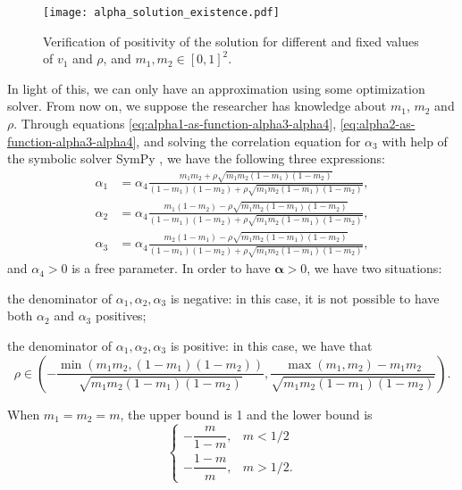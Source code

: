 \begin{figure}[!ht]
    \centering
    \caption{Verification of positivity of the solution for different and
    fixed values of $v_1$ and $\rho$, and $m_1, m_2 \in [0,1]^2$.} 
    \texttt{[image: alpha\_solution\_existence.pdf]}
    \label{fig:alpha-solutions}
\end{figure}

In light of this, we can only have an approximation using some
optimization solver. From now on, we suppose the researcher has knowledge about
$m_1$, $m_2$ and $\rho$. Through equations
\eqref{eq:alpha1-as-function-alpha3-alpha4}, 
\eqref{eq:alpha2-as-function-alpha3-alpha4}, and solving the correlation
equation for $\alpha_3$ with help of the symbolic solver SymPy \cite{sympy},
we have the following three expressions: 
\begin{equation*}
  \begin{aligned}
    \alpha_1 &= \alpha_4\frac{m_1m_2 + \rho\sqrt{m_1m_2(1-m_1)(1-m_2)}}{(1-m_1)(1-m_2) + \rho\sqrt{m_1m_2(1-m_1)(1-m_2)}}, \\
    \alpha_2 &= \alpha_4\frac{m_1(1-m_2) - \rho\sqrt{m_1m_2(1-m_1)(1-m_2)}}{(1-m_1)(1-m_2) + \rho\sqrt{m_1m_2(1-m_1)(1-m_2)}}, \\
    \alpha_3 &= \alpha_4\frac{m_2(1-m_1) - \rho\sqrt{m_1m_2(1-m_1)(1-m_2)}}{(1-m_1)(1-m_2) + \rho\sqrt{m_1m_2(1-m_1)(1-m_2)}},
  \end{aligned}
\end{equation*}
and $\alpha_4 > 0$ is a free parameter. In order to have $\boldsymbol{\alpha} >
0$, we have two situations:
\begin{alineas}
  \item the denominator of $\alpha_1, \alpha_2, \alpha_3$ is negative: in this
  case, it is not possible to have both $\alpha_2$ and $\alpha_3$ positives;
  \item the denominator of  $\alpha_1, \alpha_2, \alpha_3$ is positive: in
  this case, we have that 
  $$
  \rho \in \left(-\frac{\min(m_1m_2, (1-m_1)(1-m_2))}{\sqrt{m_1m_2(1-m_1)(1-m_2)}}, 
  \frac{\max(m_1, m_2) - m_1m_2}{\sqrt{m_1m_2(1-m_1)(1-m_2)}}\right).
  $$
\end{alineas}

When $m_1 = m_2 = m$, the upper bound is 1 and the lower bound is 
$$\begin{cases}
  -\dfrac{m}{1-m}, &m < 1/2 \\
  -\dfrac{1-m}{m}, &m > 1/2.
\end{cases}$$


